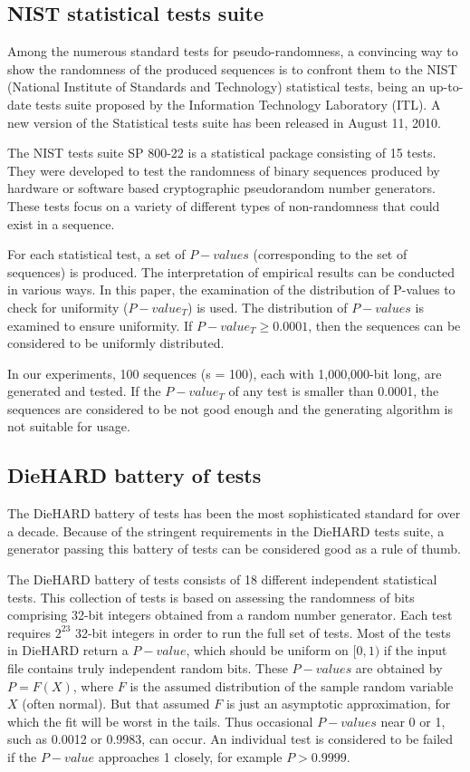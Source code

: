 \documentclass[10pt, conference, compsocconf]{IEEEtran}
\begin{document}
\subsection{NIST statistical tests suite}

Among the numerous standard tests for pseudo-randomness, a convincing way to show the randomness of the produced sequences is to confront them to the NIST (National Institute of  Standards and Technology) statistical tests, being an up-to-date tests suite proposed by the Information Technology Laboratory (ITL). A new version of the Statistical tests suite has been released in August 11, 2010.

The NIST tests suite SP 800-22 is a statistical package consisting of 15 tests. They were developed to test the randomness of binary sequences produced by hardware or software based cryptographic pseudorandom number generators. These tests focus on a variety of different types of non-randomness that could exist in a sequence.

For each statistical test, a set of $P-values$ (corresponding to the set of sequences) is produced.
The interpretation of empirical results can be conducted in various ways.
In this paper, the examination of the distribution of P-values to check for uniformity ($ P-value_{T}$) is used.
The distribution of $P-values$ is examined to ensure uniformity.
If $P-value_{T} \geqslant 0.0001$, then the sequences can be considered to be uniformly distributed.

In our experiments, 100 sequences (s = 100), each with 1,000,000-bit long, are generated and tested. If the $P-value_{T}$ of any test is smaller than 0.0001, the sequences are considered to be not good enough and the generating algorithm is not suitable for usage.





\subsection{DieHARD battery of tests}
The DieHARD battery of tests has been the most sophisticated standard for over a decade. Because of the stringent requirements in the DieHARD tests suite, a generator passing this battery of
tests can be considered good as a rule of thumb.

The DieHARD battery of tests consists of 18 different independent statistical tests. This collection
 of tests is based on assessing the randomness of bits comprising 32-bit integers obtained from
a random number generator. Each test requires $2^{23}$ 32-bit integers in order to run the full set
of tests. Most of the tests in DieHARD return a $P-value$, which should be uniform on $[0,1)$ if the input file
contains truly independent random bits.  These $P-values$ are obtained by
$P=F(X)$, where $F$ is the assumed distribution of the sample random variable $X$ (often normal).
But that assumed $F$ is just an asymptotic approximation, for which the fit will be worst
in the tails. Thus occasional $P-values$ near 0 or 1, such as 0.0012 or 0.9983, can occur.
An individual test is considered to be failed if the $P-value$ approaches 1 closely, for example $P>0.9999$.
\end{document}
